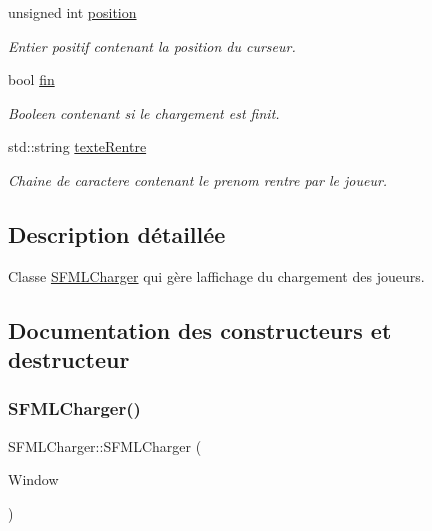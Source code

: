 \begin{DoxyCompactItemize}
unsigned int \hyperlink{class_s_f_m_l_charger_a45ec6f2520cc838a91654605af533b4e}{position}
\begin{DoxyCompactList}\small\item\em Entier positif contenant la position du curseur. \end{DoxyCompactList}\item 
\mbox{\label{class_s_f_m_l_charger_a36a115432c7bcd65e2dd38f20b8be70e}} 
bool \hyperlink{class_s_f_m_l_charger_a36a115432c7bcd65e2dd38f20b8be70e}{fin}
\begin{DoxyCompactList}\small\item\em Booleen contenant si le chargement est finit. \end{DoxyCompactList}\item 
\mbox{\label{class_s_f_m_l_charger_af2f96b2c5fa4f5ab08b5b2c7b6e5dd2d}} 
std\+::string \hyperlink{class_s_f_m_l_charger_af2f96b2c5fa4f5ab08b5b2c7b6e5dd2d}{texte\+Rentre}
\begin{DoxyCompactList}\small\item\em Chaine de caractere contenant le prenom rentre par le joueur. \end{DoxyCompactList}\end{DoxyCompactItemize}


\subsection{Description détaillée}
Classe \hyperlink{class_s_f_m_l_charger}{S\+F\+M\+L\+Charger} qui gère l\textquotesingle{}affichage du chargement des joueurs. 

\subsection{Documentation des constructeurs et destructeur}
\mbox{\label{class_s_f_m_l_charger_a2b47aabcd697f29be30d47d84321ba7e}} 
\subsubsection{\texorpdfstring{S\+F\+M\+L\+Charger()}{SFMLCharger()}}
{\footnotesize\ttfamily S\+F\+M\+L\+Charger\+::\+S\+F\+M\+L\+Charger (\begin{DoxyParamCaption}\item[{sf\+::\+Render\+Window \&}]{Window }\end{DoxyParamCaption})}



